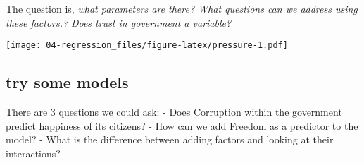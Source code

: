 \documentclass[
]{book}
\newenvironment{Shaded}{\begin{snugshade}}{\end{snugshade}}
\newcommand{\FunctionTok}[1]{\textcolor[rgb]{0.00,0.00,0.00}{#1}}
\newcommand{\NormalTok}[1]{#1}
\newcommand{\SpecialCharTok}[1]{\textcolor[rgb]{0.00,0.00,0.00}{#1}}
\theoremstyle{definition}
\theoremstyle{definition}
\theoremstyle{definition}
\theoremstyle{definition}
\theoremstyle{remark}
\begin{document}
The question is, \emph{what parameters are there? What questions can we address using these factors.?} \emph{Does trust in government a variable?}

\begin{Shaded}
\end{Shaded}

\texttt{[image: 04-regression\_files/figure-latex/pressure-1.pdf]}

\hypertarget{try-some-models}{%
\subsection{try some models}\label{try-some-models}}

There are 3 questions we could ask:
- Does Corruption within the government predict happiness of its citizens?
- How can we add Freedom as a predictor to the model?
- What is the difference between adding factors and looking at their interactions?
\end{document}

